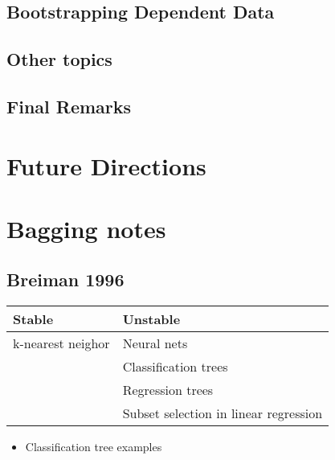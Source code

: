 \documentclass[bigger]{beamer}
\begin{document}
\subsection{Bootstrapping Dependent Data}
\label{sec-1-9}
\subsection{Other topics}
\label{sec-1-10}
\subsection{Final Remarks}
\label{sec-1-11}
\section{Future Directions}
\label{sec-2}
\section{Bagging notes}
\label{sec-3}
\subsection{Breiman 1996}
\label{sec-3-1}



\begin{center}
\begin{tabular}{ll}
 Stable             &  Unstable                               \\
\hline
 k-nearest neighor  &  Neural nets                            \\
                    &  Classification trees                   \\
                    &  Regression trees                       \\
                    &  Subset selection in linear regression  \\
\hline
\end{tabular}
\end{center}



\begin{itemize}
\item Classification tree examples
\end{itemize}
\end{document}
